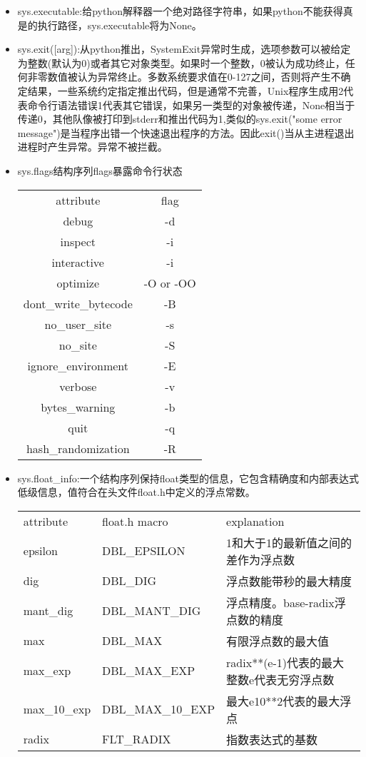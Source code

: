 \begin{itemize}
\item sys.executable:给python解释器一个绝对路径字符串，如果python不能获得真是的执行路径，sys.executable将为None。
\item sys.exit([arg]):从python推出，SystemExit异常时生成，选项参数可以被给定为整数(默认为0)或者其它对象类型。如果时一个整数，0被认为成功终止，任何非零数值被认为异常终止。多数系统要求值在0-127之间，否则将产生不确定结果，一些系统约定指定推出代码，但是通常不完善，Unix程序生成用2代表命令行语法错误1代表其它错误，如果另一类型的对象被传递，None相当于传递0，其他队像被打印到stderr和推出代码为1,类似的sys.exit("some error message")是当程序出错一个快速退出程序的方法。因此exit()当从主进程退出进程时产生异常。异常不被拦截。
\item sys.flags结构序列flags暴露命令行状态\par
\begin{tabular}{cc}
\hline
attribute & flag\\
debug & -d\\
inspect& -i\\
interactive&-i\\
optimize&-O or -OO\\
dont\_write\_bytecode&-B\\
no\_user\_site&-s\\
no\_site&-S\\
ignore\_environment&-E\\
verbose&-v\\
bytes\_warning&-b\\
quit&-q\\
hash\_randomization&-R
\end{tabular}
\item sys.float\_info:一个结构序列保持float类型的信息，它包含精确度和内部表达式低级信息，值符合在头文件float.h中定义的浮点常数。\par
\begin{tabular}{lll}
attribute&float.h macro&explanation\\
epsilon&DBL\_EPSILON&1和大于1的最新值之间的差作为浮点数\\
dig&DBL\_DIG&浮点数能带秒的最大精度\\
mant\_dig&DBL\_MANT\_DIG&浮点精度。base-radix浮点数的精度\\
max&DBL\_MAX&有限浮点数的最大值\\
max\_exp&DBL\_MAX\_EXP&radix**(e-1)代表的最大整数e代表无穷浮点数\\
max\_10\_exp&DBL\_MAX\_10\_EXP&最大e10**2代表的最大浮点\\
radix&FLT\_RADIX&指数表达式的基数\\

\end{tabular}
\end{itemize}
